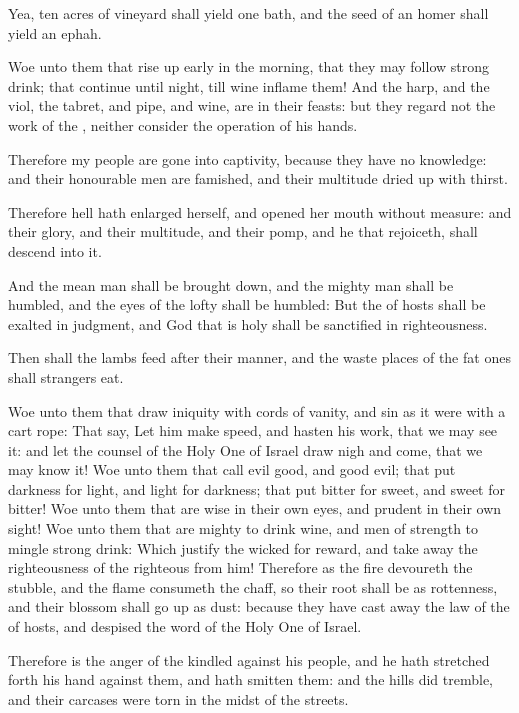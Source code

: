 \Verse Yea, ten acres of vineyard shall yield one bath, and the seed of an homer shall yield an ephah.

\Verse Woe unto them that rise up early in the morning, that they may follow strong drink; that continue until night, till wine inflame them!  \Verse And the harp, and the viol, the tabret, and pipe, and wine, are in their feasts: but they regard not the work of the \LORD, neither consider the operation of his hands.

\Verse Therefore my people are gone into captivity, because they have no knowledge: and their honourable men are famished, and their multitude dried up with thirst.

\Verse Therefore hell hath enlarged herself, and opened her mouth without measure: and their glory, and their multitude, and their pomp, and he that rejoiceth, shall descend into it.

\Verse And the mean man shall be brought down, and the mighty man shall be humbled, and the eyes of the lofty shall be humbled: \Verse But the \LORD of hosts shall be exalted in judgment, and God that is holy shall be sanctified in righteousness.

\Verse Then shall the lambs feed after their manner, and the waste places of the fat ones shall strangers eat.

\Verse Woe unto them that draw iniquity with cords of vanity, and sin as it were with a cart rope: \Verse That say, Let him make speed, and hasten his work, that we may see it: and let the counsel of the Holy One of Israel draw nigh and come, that we may know it!  \Verse Woe unto them that call evil good, and good evil; that put darkness for light, and light for darkness; that put bitter for sweet, and sweet for bitter!  \Verse Woe unto them that are wise in their own eyes, and prudent in their own sight!  \Verse Woe unto them that are mighty to drink wine, and men of strength to mingle strong drink: \Verse Which justify the wicked for reward, and take away the righteousness of the righteous from him!  \Verse Therefore as the fire devoureth the stubble, and the flame consumeth the chaff, so their root shall be as rottenness, and their blossom shall go up as dust: because they have cast away the law of the \LORD of hosts, and despised the word of the Holy One of Israel.

\Verse Therefore is the anger of the \LORD kindled against his people, and he hath stretched forth his hand against them, and hath smitten them: and the hills did tremble, and their carcases were torn in the midst of the streets.

